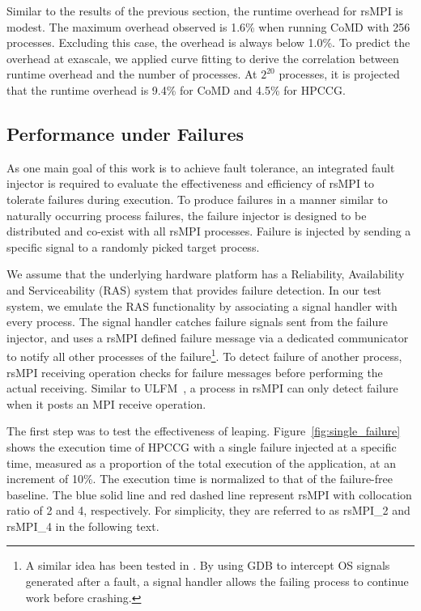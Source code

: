 Similar to the results of the previous section, the runtime overhead for rsMPI is modest. The maximum overhead observed is 1.6\% when running CoMD with 256 processes. Excluding this case, the overhead is always below 1.0\%. To predict the overhead at exascale, we applied curve fitting to derive the correlation between runtime overhead and the number of processes. At $2^{20}$ processes, it is projected that the runtime overhead is 9.4\% for CoMD and 4.5\% for HPCCG. 


\subsection{Performance under Failures}

As one main goal of this work is to achieve fault tolerance, an integrated fault injector is required to evaluate the effectiveness and efficiency of rsMPI to tolerate failures during execution. 
To produce failures in a manner similar to naturally occurring process failures, the failure injector is designed to be distributed and co-exist with all rsMPI processes. Failure is injected by sending a specific signal to a randomly picked target process.

We assume that the underlying hardware platform has a Reliability, Availability and Serviceability (RAS) system that provides failure detection. In our test system, we emulate the RAS functionality by associating a signal handler with every process. The signal handler catches failure signals sent from the failure injector, and uses a rsMPI defined failure message via a dedicated communicator to notify all other processes of the failure\footnote{A similar idea has been tested in \cite{fang2017letgo}. By using GDB to intercept OS signals generated after a fault, a signal handler allows the failing process to continue work before crashing.}. 
To detect failure of another process, rsMPI receiving operation checks for failure messages before performing the actual receiving. 
Similar to ULFM~\cite{bland2013post}, a process in rsMPI can only detect failure when it posts an MPI receive operation. 

The first step was to test the effectiveness of leaping.  
Figure~\ref{fig:single_failure} shows the execution time of HPCCG with a single failure injected at a specific time, measured as a proportion of the total execution of the application, at an increment of 10\%.
The execution time is normalized to that of the failure-free baseline.   
The blue solid line and red dashed line represent rsMPI with collocation ratio of 2 and 4, respectively. For simplicity, they are referred to as rsMPI\_2 and rsMPI\_4 in the following text.  


